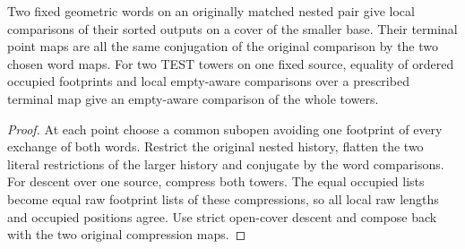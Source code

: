 \begin{proposition}
\label{hir:g8-fixed-nested-word-cover-descent}
\leanok
Two fixed geometric words on an originally matched nested pair
give local comparisons of their sorted outputs on a cover of the
smaller base. Their terminal point maps are all the same conjugation
of the original comparison by the two chosen word maps. For two
TEST towers on one fixed source, equality of ordered occupied
footprints and local empty-aware comparisons over a prescribed
terminal map give an empty-aware comparison of the whole towers.
\end{proposition}
\begin{proof}
At each point choose a common subopen avoiding one footprint of
every exchange of both words. Restrict the original nested history,
flatten the two literal restrictions of the larger history and
conjugate by the word comparisons. For descent over one source,
compress both towers. The equal occupied lists become equal raw
footprint lists of these compressions, so all local raw lengths
and occupied positions agree. Use strict open-cover descent
and compose back with the two original compression maps.
\end{proof}

